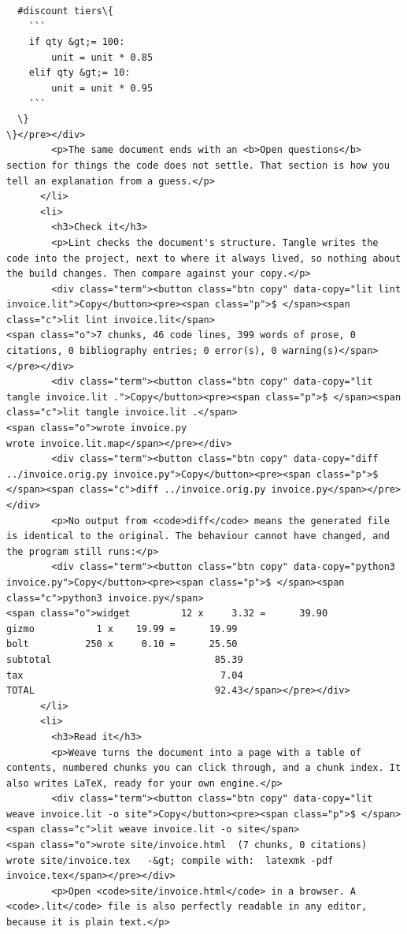 \documentclass[10pt,a4paper]{article}
\newcounter{chunk}
\begin{document}
\begin{Verbatim}
  #discount tiers\{
    ```
    if qty &gt;= 100:
        unit = unit * 0.85
    elif qty &gt;= 10:
        unit = unit * 0.95
    ```
  \}
\}</pre></div>
        <p>The same document ends with an <b>Open questions</b> section for things the code does not settle. That section is how you tell an explanation from a guess.</p>
      </li>
      <li>
        <h3>Check it</h3>
        <p>Lint checks the document's structure. Tangle writes the code into the project, next to where it always lived, so nothing about the build changes. Then compare against your copy.</p>
        <div class="term"><button class="btn copy" data-copy="lit lint invoice.lit">Copy</button><pre><span class="p">$ </span><span class="c">lit lint invoice.lit</span>
<span class="o">7 chunks, 46 code lines, 399 words of prose, 0 citations, 0 bibliography entries; 0 error(s), 0 warning(s)</span></pre></div>
        <div class="term"><button class="btn copy" data-copy="lit tangle invoice.lit .">Copy</button><pre><span class="p">$ </span><span class="c">lit tangle invoice.lit .</span>
<span class="o">wrote invoice.py
wrote invoice.lit.map</span></pre></div>
        <div class="term"><button class="btn copy" data-copy="diff ../invoice.orig.py invoice.py">Copy</button><pre><span class="p">$ </span><span class="c">diff ../invoice.orig.py invoice.py</span></pre></div>
        <p>No output from <code>diff</code> means the generated file is identical to the original. The behaviour cannot have changed, and the program still runs:</p>
        <div class="term"><button class="btn copy" data-copy="python3 invoice.py">Copy</button><pre><span class="p">$ </span><span class="c">python3 invoice.py</span>
<span class="o">widget         12 x     3.32 =      39.90
gizmo           1 x    19.99 =      19.99
bolt          250 x     0.10 =      25.50
subtotal                             85.39
tax                                   7.04
TOTAL                                92.43</span></pre></div>
      </li>
      <li>
        <h3>Read it</h3>
        <p>Weave turns the document into a page with a table of contents, numbered chunks you can click through, and a chunk index. It also writes LaTeX, ready for your own engine.</p>
        <div class="term"><button class="btn copy" data-copy="lit weave invoice.lit -o site">Copy</button><pre><span class="p">$ </span><span class="c">lit weave invoice.lit -o site</span>
<span class="o">wrote site/invoice.html  (7 chunks, 0 citations)
wrote site/invoice.tex   -&gt; compile with:  latexmk -pdf invoice.tex</span></pre></div>
        <p>Open <code>site/invoice.html</code> in a browser. A <code>.lit</code> file is also perfectly readable in any editor, because it is plain text.</p>

\end{Verbatim}
\end{document}
